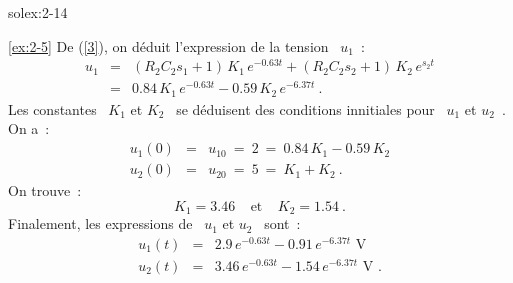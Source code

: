 \begin{exwithsol}{solex:2-14}
\begin{solexercise}{\ref{ex:2-5}}
De (\ref{3}), on d\'eduit l'expression de la tension \ $u_1$~:
\begin{eqnarray*}
	u_1 &=& (R_2C_2s_1+1) \, K_1\, e^{-0.63t} + (R_2C_2s_2+1) \, K_2 \, e^{s_2t} \\
	&=& 0.84\, K_1 \, e^{-0.63t} - 0.59\, K_2\, e^{-6.37t}~. 
\end{eqnarray*}
Les constantes \ $K_1$ et $K_2$ \ se d\'eduisent des conditions innitiales pour \ $u_1$ et $u_2$~.
On a~:
\begin{eqnarray*}
	u_1(0) &=& u_{10} \: = \: 2 \: = \: 0.84\, K_1 - 0.59\, K_2\\
	u_2(0) &=& u_{20} \: = \: 5 \: = \: K_1 + K_2~.
\end{eqnarray*}
On trouve~:
\[ K_1 = 3.46 ~~~~~\mbox{et}~~~~~K_2 = 1.54~. \]
Finalement, les expressions de \ $u_1$ et $u_2$ \ sont~:
\begin{eqnarray*}
	u_1(t) &=& 2.9\, e^{-0.63t} - 0.91 \, e^{-6.37t}\mbox{~V}\\
	u_2(t) &=& 3.46\, e^{-0.63t} - 1.54 \, e^{-6.37t}\mbox{~V~.}
\end{eqnarray*}
\end{solexercise}


\end{exwithsol}
